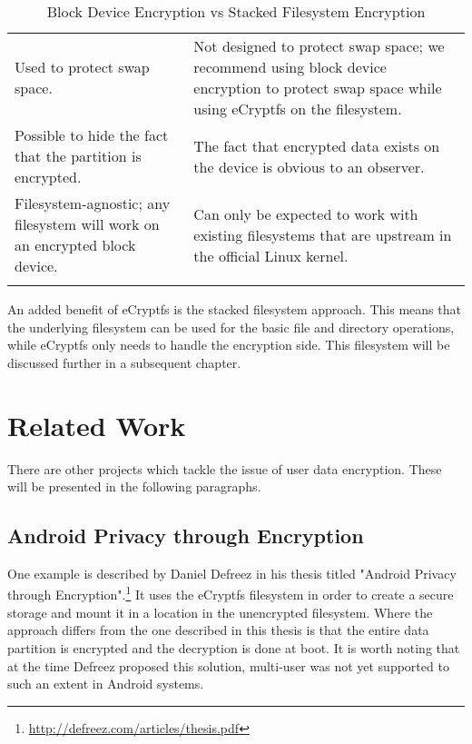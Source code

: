 \begin{table}[tp]
\begin{tabularx}{\textwidth}{|| m{} || m{} ||}
		\hhline{|:=::=:|}
		Used to protect swap space. & Not designed to protect swap space; we recommend using block device encryption to protect swap space while using eCryptfs on the filesystem. \\
		\hhline{|:=::=:|}
		Possible to hide the fact that the partition is encrypted. & The fact that encrypted data exists on the device is obvious to an observer. \\
		\hhline{|:=::=:|}
		Filesystem-agnostic; any filesystem will work on an encrypted block device. & Can only be expected to work with existing filesystems that are upstream in the official Linux kernel. \\
		\hhline{|b:=:b:=:b|}
	\end{tabularx}
	\caption{Block Device Encryption vs Stacked Filesystem Encryption}
\end{table}

An added benefit of eCryptfs is the stacked filesystem approach. This means that the underlying filesystem can be used for the basic file and directory operations, while eCryptfs only needs to handle the encryption side.
This filesystem will be discussed further in a subsequent chapter.

\section{Related Work}
\label{sec:related-work}

There are other projects which tackle the issue of user data encryption. These will be presented in the following paragraphs.

\subsection{Android Privacy through Encryption}
\label{sub-sec:and-priv-defreez}

One example is described by Daniel Defreez in his thesis titled "Android Privacy through Encryption".\footnote{\url{http://defreez.com/articles/thesis.pdf}}
It uses the eCryptfs filesystem in order to create a secure storage and mount it in a location in the unencrypted filesystem. Where the approach differs from the one described in this thesis is that the entire data partition is encrypted and the decryption is done at boot. It is worth noting that at the time Defreez proposed this solution, multi-user was not yet supported to such an extent in Android systems.

